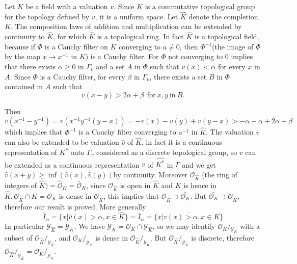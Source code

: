 Let $K$ be a field with a valuation $v$. Since $K$ is a commutative
topological group for the topology defined by $v$, it is a uniform
space. Let $\hat{K}$ denote the completion $K$. The composition laws
of addition and multiplication can be extended by continuity to
$\hat{K}$, for which $\hat{K}$ is a topological ring. In fact
$\hat{K}$ is a topological field, because if $\Phi$ is a Cauchy filter
on $K$ converging to $ a \neq 0$, then $\Phi^{-1}$(the image of $\Phi$
by the map $x \to x^{-1}$ in $K$) is a Cauchy filter. For $\Phi$ not
converging to $0$ implies that there exists $\alpha \ge 0$ in
$\Gamma_{v}$ and a set $A$ in $\Phi$ such that $v(x) < \alpha$ for
every $x$ in $A$. Since $\Phi$ is a Cauchy filter, for every $\beta$
in $\Gamma_{v}$, there exists a set $B$ in $\Phi$ contained in $A$
such that 
$$
v(x-y) > 2 \alpha+ \beta ~~\text{for}~ x, y~ \text{in}~ B.
$$   

Then
$$
v(x^{-1}-y^{-1}) = v(x^{-1}y^{-1}(y-x)) = -v(x)-v(y)+v(y-x) > -\alpha
- \alpha +2 \alpha + \beta 
$$
which implies that $\Phi^{-1}$ is a Cauchy filter converging to
$a^{-1}$ in $\hat{K}$. The valuation $v$ can also be extended to be
valuation $\hat{v}$ of $\hat{K}$, in fact it is a continuous
representation of $K^{*}$ onto $\Gamma_{v}$ considered as a discrete
topological group, so $v$ can be extended as a continuous
representation $\hat{v}$ of $\hat{K^{*}}$ in $\Gamma$ and we get
$\hat{v} (x+y) \ge \inf (\hat{v} (x), \hat{v}(y))$\pageoriginale by
continuity. Moreover $\mathscr{O}_{\hat{K}}$ (the ring of integers of
$\hat{K})= \hat{\mathscr{O}}_{K} = \bar{\mathscr{O}}_{K}$, since
$\mathscr{O}_{\hat{K}}$ is open in $\hat{K}$ and $K$ is hence in
$\hat{K},\mathscr{O}_{\hat{K}} \cap K = \mathscr{O}_{K}$ is dense in
$\mathscr{O}_{\hat{K}}$, this implies that $\mathscr{O}_{\hat{K}}
\supset \bar{\mathscr{O}_{K}}$. But $\bar{\mathscr{O}_{K}} \supset
\mathscr{O}_{\hat{K}}$, therefore our result is proved. More generally  
$$
\hat{I}_{\alpha} = \bigg\{ x | \hat{v}(x) > \alpha,  x \in
\hat{K}\bigg\} = \bar{I}_{\alpha} = \overline{\bigg\{ x | v(x) >
  \alpha,  x \in K \bigg\}} 
$$
In particular $\mathscr{Y}_{\hat{K}} = \bar{\mathscr{Y}_{K}}$. We have
$\mathscr{Y}_{K} = \mathscr{O}_{K} \cap \mathscr{Y}_{\hat{K}}$, so we
may identify $\mathscr{O}_{K}/{_{\mathscr{Y}_{K}}}$ with a subset of
$\mathscr{O}_{\hat{K}}/_{\mathscr{Y}_{\hat{K}}}$, and
$\mathscr{O}_{K}/_{\mathscr{Y}_{K}}$ is dense in
$\mathscr{O}_{\hat{K}}/_{\mathscr{Y}_{\hat{K}}}$. But
$\mathscr{O}_{\hat{K}}/_{\mathscr{Y}_{\hat{K}}}$ is discrete,
therefore $\mathscr{O}_{\hat{K}}/_{\mathscr{Y}_{\hat{K}}} =
\mathscr{O}_{K}/_{\mathscr{Y}_{K}}$. 

